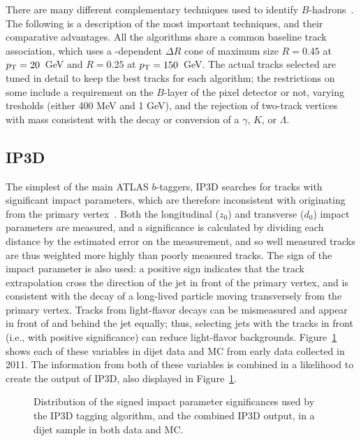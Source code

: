 There are many different complementary techniques used to identify $B$-hadrons~\cite{ATLAS-B}. The following is a description of the most important techniques, and their comparative advantages. All the algorithms share a common baseline track association, which uses a \pt-dependent $\Delta R$ cone of maximum size $R=0.45$ at $p_{\text{T}} = 20$~GeV and $R=0.25$ at $p_{\text{T}} = 150$~GeV. The actual tracks selected are tuned in detail to keep the best tracks for each algorithm; the restrictions on some include a requirement on the $B$-layer of the pixel detector or not, varying \pt tresholds (either 400 MeV and 1 GeV), and the rejection of two-track vertices with mass consistent with the decay or conversion of a $\gamma$, $K$, or $\Lambda$.

\subsection{IP3D}

The simplest of the main ATLAS $b$-taggers, IP3D searches for tracks with significant impact parameters, which are therefore inconsistent with originating from the primary vertex~\cite{ATLAS-B}. Both the longitudinal ($z_0$) and transverse ($d_0$) impact parameters are measured, and a significance is calculated by dividing each distance by the estimated error on the measurement, and so well measured tracks are thus weighted more highly than poorly measured tracks. The sign of the impact parameter is also used: a positive sign indicates that the track extrapolation cross the direction of the jet in front of the primary vertex, and is consistent with the decay of a long-lived particle moving transversely from the primary vertex. Tracks from light-flavor decays can be mismeasured and appear in front of and behind the jet equally; thus, selecting jets with the tracks in front (i.e., with positive significance) can reduce light-flavor backgrounds. Figure~\ref{fig:jet-reconstruction:b-tagging:ip3d} shows each of these variables in dijet data and MC from early data collected in 2011. The information from both of these variables is combined in a likelihood to create the output of IP3D, also displayed in Figure~\ref{fig:jet-reconstruction:b-tagging:ip3d}.


\begin{figure}
\centering
{}
\label{fig:jet-reconstruction:b-tagging:ip3d}
\caption{Distribution of the signed impact parameter significances used by the IP3D tagging algorithm, and the combined IP3D output, in a dijet sample in both data and MC.}
\end{figure}

